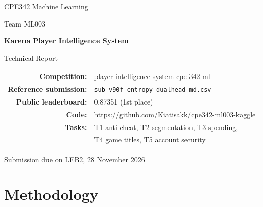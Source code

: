 \documentclass[11pt,a4paper]{article}
\begin{document}
\raggedbottom

\begin{titlepage}
\centering
\vspace*{18mm}
{\large CPE342 Machine Learning\par}
\vspace{4mm}
{\large Team ML003\par}
\vspace{14mm}
{\Huge\bfseries Karena Player Intelligence System\par}
\vspace{3mm}
{\LARGE Technical Report\par}
\vspace{14mm}
\begin{tabular}{@{}rl@{}}
\textbf{Competition:} & player-intelligence-system-cpe-342-ml \\
\textbf{Reference submission:} & \texttt{sub\_v90f\_entropy\_dualhead\_md.csv} \\
\textbf{Public leaderboard:} & 0.87351 (1st place) \\
\textbf{Code:} & \url{https://github.com/Kiatisakk/cpe342-ml003-kaggle} \\
\textbf{Tasks:} & T1 anti-cheat, T2 segmentation, T3 spending, \\
 & T4 game titles, T5 account security \\
\end{tabular}\par
\vspace{14mm}
\par
\vfill
{\small Submission due on LEB2, 28 November 2026\par}
\end{titlepage}

\tableofcontents
\clearpage
\listoffigures
\listoftables
\clearpage



\section{Methodology}
\label{sec:methodology}













\end{document}

